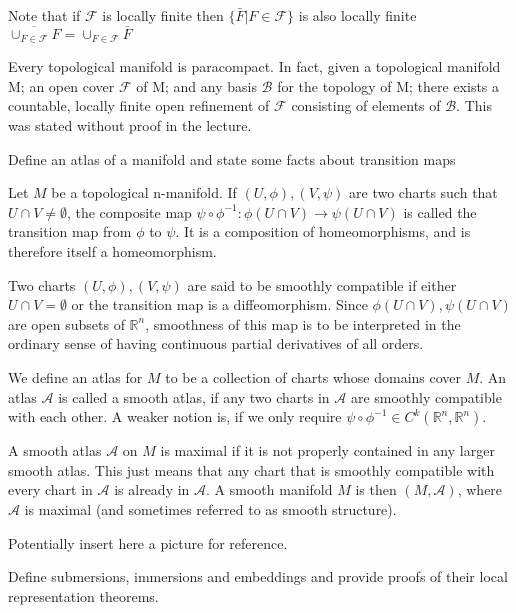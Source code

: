 Note that if \( \mathcal{F} \) is locally finite then 
\( \{\bar{F}| F \in \mathcal{F}\}   \) is also locally finite
\( \overline{\cup_{F \in \mathcal{F}} F} = \cup_{F \in \mathcal{F}} \bar{F}\)

Every topological manifold is paracompact. In fact, given a topological manifold M; an open cover \( \mathcal{F} \) of M;
and any basis \( \mathcal{B} \) for the topology of M; there exists a countable, locally finite open
refinement of \( \mathcal{F} \) consisting of elements of \( \mathcal{B} \).
This was stated without proof in the lecture.



Define an atlas of a manifold and state some facts about transition maps

Let \( M \) be a topological n-manifold. If \( (U, \phi), (V, \psi) \) are two charts such that
\( U \cap V \neq \emptyset \), the composite map \( \psi \circ \phi^{-1} : \phi(U \cap V) \to \psi(U \cap V)\) 
is called the transition map from \( \phi \) to \( \psi \). It is a composition of homeomorphisms, and
is therefore itself a homeomorphism. 

Two charts \( (U, \phi), (V, \psi) \) are said to be
smoothly compatible if either \( U \cap V = \emptyset \) or the transition map is a diffeomorphism. 
Since \(\phi(U \cap V), \psi(U \cap V)\) are open subsets of \( \mathbb{R}^n \), smoothness
of this map is to be interpreted in the ordinary sense of having continuous partial
derivatives of all orders.

We define an atlas for \( M \) to be a collection of charts whose domains cover \( M \).
An atlas \( \mathcal{A} \) is called a smooth atlas, if any two charts in \( \mathcal{A} \) are 
smoothly compatible with each other. A weaker notion is, if we only require 
\( \psi \circ \phi^{-1} \in C^{k}(\mathbb{R}^n, \mathbb{R}^n)\).

A smooth atlas \( \mathcal{A} \) on \( M \) is maximal if it is
not properly contained in any larger smooth atlas. This just means that any chart that
is smoothly compatible with every chart in \( \mathcal{A} \) is already in \( \mathcal{A} \).
A smooth manifold \( M \) is then \( (M, \mathcal{A}) \), where \( \mathcal{A} \) is maximal 
(and sometimes referred to as smooth structure).

Potentially insert here a picture for reference.

Define submersions, immersions and embeddings
and provide proofs of their local representation theorems.

